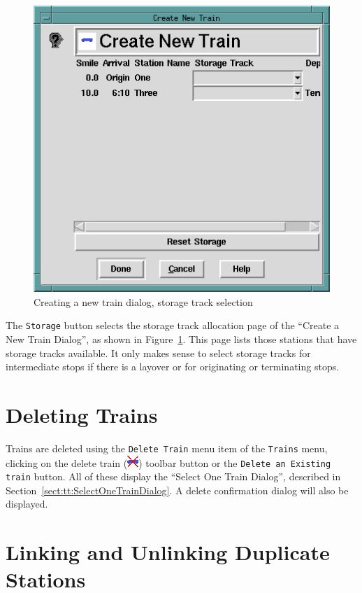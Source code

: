 \begin{figure}[hbpt]
\begin{centering}   
\includegraphics{TTCreateNewTrain3.png}
\caption{Creating a new train dialog, storage track selection}
\label{fig:tt:CreateNewTrain3}
\end{centering}
\end{figure}
The \texttt{Storage} button selects the storage track allocation page of
the ``Create a New Train Dialog'', as shown in
Figure~\ref{fig:tt:CreateNewTrain3}.  This page lists those stations
that have storage tracks available.  It only makes sense to select
storage tracks for intermediate stops if there is a layover or for
originating or terminating stops.

\section{Deleting Trains}
\label{sect:tt:DeletingTrains}

Trains are deleted using the \texttt{Delete Train} menu item of the
\texttt{Trains} menu, clicking on the delete train
(\includegraphics{TTdeletetrain.png}) toolbar button or the
\texttt{Delete an Existing train} button. All of these display the
``Select One Train Dialog'', described in
Section~\ref{sect:tt:SelectOneTrainDialog}. A delete confirmation
dialog will also be displayed.

\section{Linking and Unlinking Duplicate Stations}

